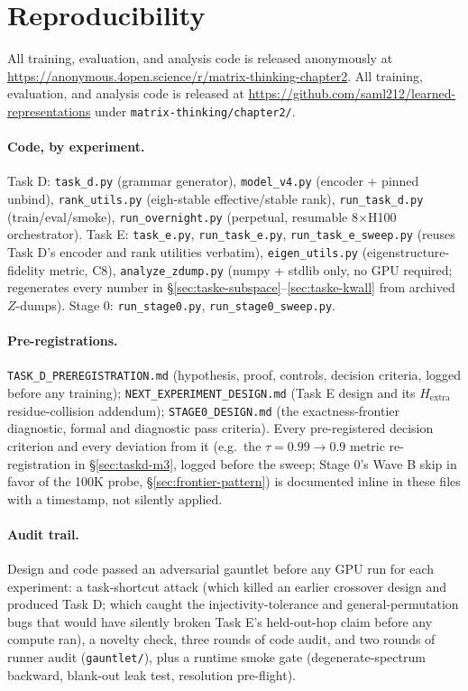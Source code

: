 \section*{Reproducibility}
\label{sec:repro}

\if{}
All training, evaluation, and analysis code is released anonymously at
\url{https://anonymous.4open.science/r/matrix-thinking-chapter2}.
\else
All training, evaluation, and analysis code is released at
\url{https://github.com/saml212/learned-representations} under
\texttt{matrix-thinking/chapter2/}.
\fi

\paragraph{Code, by experiment.} Task D: \texttt{task\_d.py} (grammar
generator), \texttt{model\_v4.py} (encoder + pinned unbind),
\texttt{rank\_utils.py} (eigh-stable effective/stable rank),
\texttt{run\_task\_d.py} (train/eval/smoke), \texttt{run\_overnight.py}
(perpetual, resumable 8$\times$H100 orchestrator). Task E: \texttt{task\_e.py},
\texttt{run\_task\_e.py}, \texttt{run\_task\_e\_sweep.py} (reuses Task D's
encoder and rank utilities verbatim), \texttt{eigen\_utils.py}
(eigenstructure-fidelity metric, C8), \texttt{analyze\_zdump.py} (numpy +
stdlib only, no GPU required; regenerates every number in
\S\ref{sec:taske-subspace}--\ref{sec:taske-kwall} from archived $Z$-dumps).
Stage 0: \texttt{run\_stage0.py}, \texttt{run\_stage0\_sweep.py}.

\paragraph{Pre-registrations.} \texttt{TASK\_D\_PREREGISTRATION.md}
(hypothesis, proof, controls, decision criteria, logged before any
training); \texttt{NEXT\_EXPERIMENT\_DESIGN.md} (Task E design and its
$H_{\mathrm{extra}}$ residue-collision addendum); \texttt{STAGE0\_DESIGN.md}
(the exactness-frontier diagnostic, formal and diagnostic pass criteria).
Every pre-registered decision criterion and every deviation from it (e.g.\
the $\tau{=}0.99\to0.9$ metric re-registration in \S\ref{sec:taskd-m3},
logged before the sweep; Stage 0's Wave B skip in favor of the 100K probe,
\S\ref{sec:frontier-pattern}) is documented inline in these files with a
timestamp, not silently applied.

\paragraph{Audit trail.} Design and code passed an adversarial gauntlet
before any GPU run for each experiment: a task-shortcut attack (which
killed an earlier crossover design and produced Task D; which caught the
injectivity-tolerance and general-permutation bugs that would have silently
broken Task E's held-out-hop claim before any compute ran), a novelty
check, three rounds of code audit, and two rounds of runner audit
(\texttt{gauntlet/}), plus a runtime smoke gate (degenerate-spectrum
backward, blank-out leak test, resolution pre-flight).

